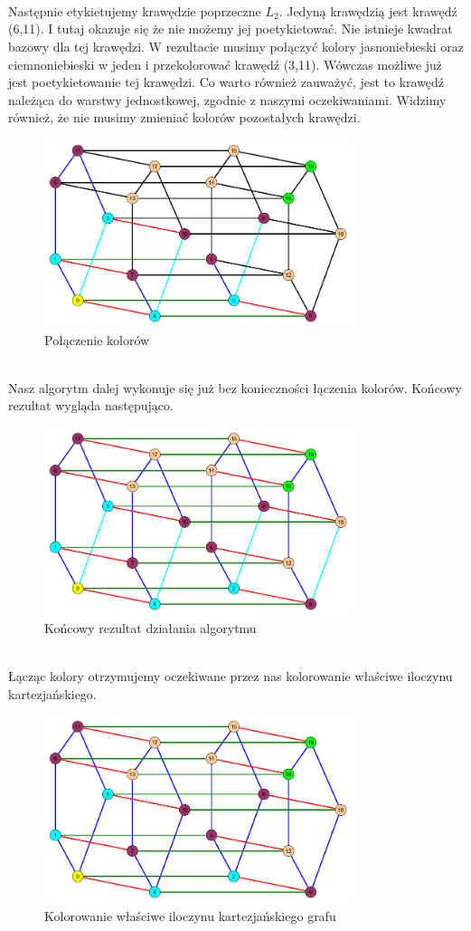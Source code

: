 \documentclass[12pt,a4paper,titlepage]{article}
\newcommand\tab[1][1cm]{\hspace*{#1}}
\begin{document}
\\
\\
\\
\tab[0.6cm]Następnie etykietujemy krawędzie poprzeczne $L_2$. Jedyną krawędzią jest krawędź (6,11). I tutaj okazuje się że nie możemy jej poetykietować. Nie istnieje kwadrat bazowy dla tej krawędzi. W rezultacie musimy połączyć kolory jasnoniebieski oraz ciemnoniebieski w jeden i przekolorować krawędź (3,11). Wówczas możliwe już jest poetykietowanie tej krawędzi. Co warto również zauważyć, jest to krawędź należąca do warstwy jednostkowej, zgodnie z naszymi oczekiwaniami. Widzimy również, że nie musimy zmieniać kolorów pozostałych krawędzi.\\
\begin{figure}[h]
\centering
\includegraphics[width = 9cm]{fak3.png}
\caption{Połączenie kolorów}
\end{figure}
\\
\tab[0.6cm]Nasz algorytm dalej wykonuje się już bez konieczności łączenia kolorów. Końcowy rezultat wygląda następująco.\\
\begin{figure}[h]
\centering
\includegraphics[width = 9cm]{fak4.png}
\caption{Końcowy rezultat działania algorytmu}
\end{figure}
\\
\tab[0.6cm]Łącząc kolory otrzymujemy oczekiwane przez nas kolorowanie właściwe iloczynu kartezjańskiego.
\begin{figure}[h]
\centering
\includegraphics[width = 9cm]{kol5.png}
\caption{Kolorowanie właściwe iloczynu kartezjańskiego grafu}
\end{figure}
\newpage
\end{document}

